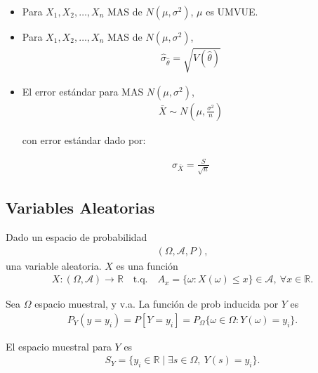 \begin{Note}
\begin{itemize}
\item[a) ]Para $X_1, X_2, \ldots, X_n$ MAS de $N(\mu,\sigma^2)$, $\mu$ es UMVUE.

\item[b) ] Para $X_1, X_2, \ldots, X_n$ MAS de $N(\mu,\sigma^2)$,
\begin{eqnarray*}
\hat{\sigma}_{\hat{\theta}} = \sqrt{V(\hat{\theta})}
\end{eqnarray*}

\item[c) ] El error est\'andar para MAS $N(\mu,\sigma^2)$,
\begin{eqnarray*}
\bar{X} \sim N\left(\mu,\frac{\sigma^2}{n}\right)
\end{eqnarray*}

con error est\'andar dado por:

\begin{eqnarray*}
\hat{\sigma}_{\bar{X}} = \frac{S}{\sqrt{n}}
\end{eqnarray*}
\end{itemize}
\end{Note}

\subsection{Variables Aleatorias}

\begin{Def} Dado un espacio de probabilidad
\begin{eqnarray*}
(\Omega,\mathcal{A},P),
\end{eqnarray*}
una variable aleatoria. $X$ es una funci\'on
\begin{eqnarray*}
X:(\Omega,\mathcal{A}) \to \mathbb{R}
\quad \text{t.q.} \quad
A_x=\{\omega: X(\omega)\le x\}\in\mathcal{A},
\ \forall x\in\mathbb{R}.
\end{eqnarray*}
\end{Def}

\begin{Def} Sea $\Omega$ espacio muestral, y v.a.
La funci\'on de prob inducida por $Y$ es
\begin{eqnarray*}
P_Y(y=y_i)=P[Y=y_i]= P_\Omega\{\omega\in\Omega: Y(\omega)=y_i\}.
\end{eqnarray*}

El espacio muestral para $Y$ es
\begin{eqnarray*}
S_Y=\{y_i\in\mathbb{R}\mid \exists s\in\Omega,\ Y(s)=y_i\}.
\end{eqnarray*}
\end{Def}

